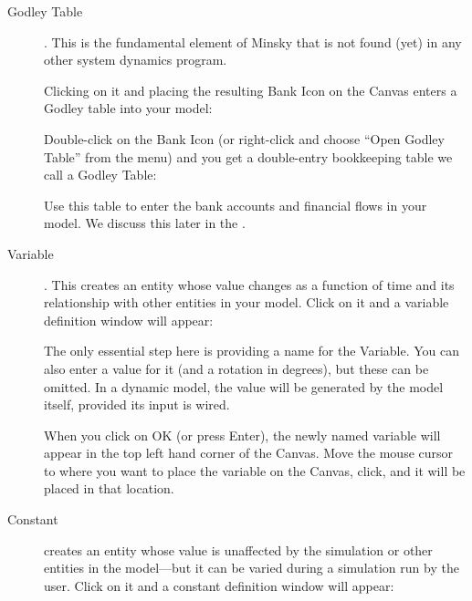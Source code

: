 \begin{description}
\item[Godley Table] . \label{GodleyTable} This is the
fundamental element of Minsky that is not found (yet) in any other
system dynamics program. 

Clicking on it and placing the resulting Bank Icon on the Canvas
enters a Godley table into your model:

\begin{center}
\end{center}

Double-click on the Bank Icon (or right-click and choose ``Open Godley
Table'' from the menu) and you get a double-entry bookkeeping table we
call a Godley Table: 


 
Use this table to enter the bank accounts and financial flows in your model. We discuss this later in the .

\item[Variable]  . \label{Variable} This creates an entity
whose value changes as a function of time and its relationship with
other entities in your model. Click on it and a variable definition
window will appear:

\begin{center}
\end{center}

The only essential step here is providing a name for the Variable. You
can also enter a value for it (and a rotation in degrees), but these
can be omitted. In a dynamic model, the value will be generated by the
model itself, provided its input is wired.


When you click on OK (or press Enter), the newly named variable will
appear in the top left hand corner of the Canvas. Move the mouse
cursor to where you want to place the variable on the Canvas, click,
and it will be placed in that location.


\item[Constant]  \label{Constant} creates an entity whose
value is unaffected by the simulation or other entities in the
model---but it can be varied during a simulation run by the
user. Click on it and a constant definition window will appear:

\begin{center}
\end{center}


\end{description}
